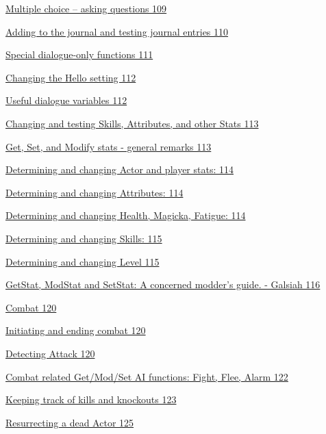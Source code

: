 \documentclass[
]{article}
\begin{document}
\protect\hyperlink{multiple-choice-asking-questions}{Multiple choice --
asking questions 109}

\protect\hyperlink{adding-to-the-journal-and-testing-journal-entries}{Adding
to the journal and testing journal entries 110}

\protect\hyperlink{special-dialogue-only-functions}{Special
dialogue-only functions 111}

\protect\hyperlink{changing-the-hello-setting}{Changing the Hello
setting 112}

\protect\hyperlink{useful-dialogue-variables}{Useful dialogue variables
112}

\protect\hyperlink{changing-and-testing-skills-attributes-and-other-stats}{Changing
and testing Skills, Attributes, and other Stats 113}

\protect\hyperlink{get-set-and-modify-stats---general-remarks}{Get, Set,
and Modify stats - general remarks 113}

\protect\hyperlink{determining-and-changing-actor-and-player-stats}{Determining
and changing Actor and player stats: 114}

\protect\hyperlink{determining-and-changing-attributes}{Determining and
changing Attributes: 114}

\protect\hyperlink{determining-and-changing-health-magicka-fatigue}{Determining
and changing Health, Magicka, Fatigue: 114}

\protect\hyperlink{determining-and-changing-skills}{Determining and
changing Skills: 115}

\protect\hyperlink{determining-and-changing-level}{Determining and
changing Level 115}

\protect\hyperlink{_Toc182634604}{GetStat, ModStat and SetStat: A
concerned modder's guide. - Galsiah 116}

\protect\hyperlink{combat}{Combat 120}

\protect\hyperlink{initiating-and-ending-combat}{Initiating and ending
combat 120}

\protect\hyperlink{detecting-attack}{Detecting Attack 120}

\protect\hyperlink{combat-related-getmodset-ai-functions-fight-flee-alarm}{Combat
related Get/Mod/Set AI functions: Fight, Flee, Alarm 122}

\protect\hyperlink{keeping-track-of-kills-and-knockouts}{Keeping track
of kills and knockouts 123}

\protect\hyperlink{resurrecting-a-dead-actor}{Resurrecting a dead Actor
125}
\end{document}
